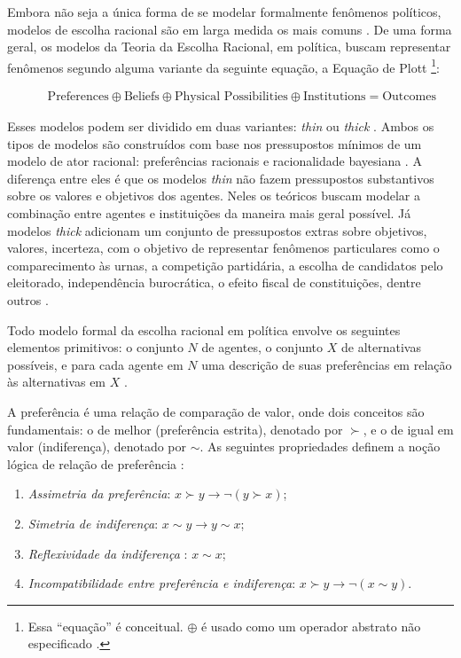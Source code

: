 Embora não seja a única forma de se modelar formalmente fenômenos políticos,
modelos de escolha racional são em larga medida os mais comuns
\cite{austen1998social}. De uma forma geral, os modelos da Teoria da Escolha
Racional, em política, buscam representar fenômenos segundo alguma variante da
seguinte equação, a Equação de Plott \cite{munger2015choosing,
  ostrom1986agenda}\footnote{Essa ``equação'' é conceitual. \(\oplus\) é usado como
  um operador abstrato não especificado \cite{ostrom1986agenda}. }:
\begin{figure}[H]
\begin{align*}
  \text{Preferences} \oplus \text{Beliefs}  \oplus  \text{Physical Possibilities} \oplus \text{Institutions} = \text{Outcomes}
\end{align*}
\end{figure}
Esses modelos podem ser dividido em duas variantes: \textit{thin} ou
\textit{thick} \cite{hechter1997sociological, green1996pathologies}. Ambos os
tipos de modelos são construídos com base nos pressupostos mínimos de um modelo
de ator racional: preferências racionais e racionalidade bayesiana
\cite{gintis2016individuality}. A diferença entre eles é que os modelos
\textit{thin} não fazem pressupostos substantivos sobre os valores e objetivos
dos agentes. Neles os teóricos buscam modelar a combinação entre agentes e
instituições da maneira mais geral possível. Já modelos \textit{thick} adicionam
um conjunto de pressupostos extras sobre objetivos, valores, incerteza, com o
objetivo de representar fenômenos particulares como o comparecimento às urnas, a
competição partidária, a escolha de candidatos pelo eleitorado, independência
burocrática, o efeito fiscal de constituições, dentre outros
\cite{bendor2011behavioral}.

Todo modelo formal da escolha racional em política envolve os seguintes
elementos primitivos: o conjunto $N$ de agentes, o conjunto \(X\) de
alternativas possíveis, e para cada agente em \(N\) uma descrição de suas
preferências em relação às alternativas em \(X\) \cite[p.
263]{austen1998social}.

A preferência é uma relação de comparação de valor, onde dois conceitos são
fundamentais: o de melhor (preferência estrita), denotado por \(\succ\),  e o de igual
em valor (indiferença), denotado por \(\sim\). As seguintes propriedades definem a
noção lógica de relação de preferência \cite{sep-preferences}:

\begin{enumerate}
\item \textit{Assimetria da preferência}: \( x \succ y \to \neg (y \succ x )\); 
\item \textit{Simetria de indiferença}: \(x \sim y \to  y \sim x\); 
\item \textit{Reflexividade da indiferença }: \(x \sim x\); 
\item \textit{Incompatibilidade entre preferência e indiferença}: \(x \succ y \to \neg ( x
  \sim y)\).
\end{enumerate}

